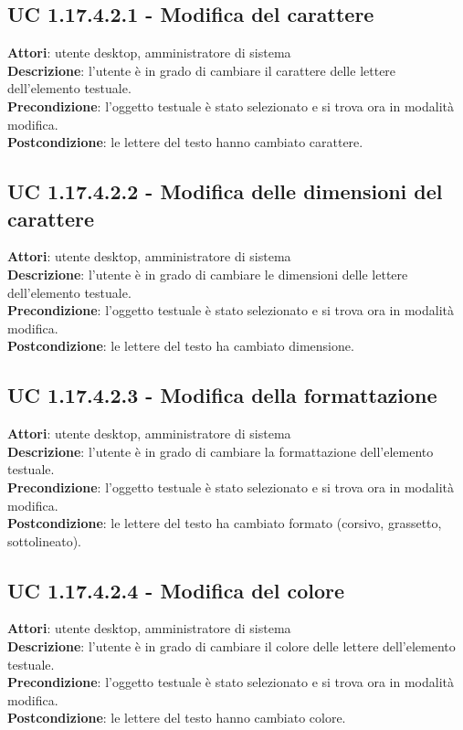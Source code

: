 \subsection{UC 1.17.4.2.1 - Modifica del carattere}{
	\label{uc1.17.4.2.1}
	\textbf{Attori}: utente desktop, amministratore di sistema \\
	\textbf{Descrizione}: l'utente è in grado di cambiare il carattere delle lettere dell’elemento testuale. \\
	\textbf{Precondizione}: l'oggetto testuale è stato selezionato e si trova ora in modalità modifica.\\
	\textbf{Postcondizione}: le lettere del testo hanno cambiato carattere.	\\
	}
\subsection{UC 1.17.4.2.2 - Modifica delle dimensioni del carattere}{
	\label{uc1.17.4.2.2}
	\textbf{Attori}: utente desktop, amministratore di sistema \\
	\textbf{Descrizione}: l'utente è in grado di cambiare le dimensioni delle lettere dell’elemento testuale. \\
	\textbf{Precondizione}: l'oggetto testuale è stato selezionato e si trova ora in modalità modifica.\\
	\textbf{Postcondizione}: le lettere del testo ha cambiato dimensione.	\\
	}
\subsection{UC 1.17.4.2.3 - Modifica della formattazione}{
	\label{uc1.17.4.2.3}
	\textbf{Attori}: utente desktop, amministratore di sistema \\
	\textbf{Descrizione}: l'utente è in grado di cambiare la formattazione dell’elemento testuale. \\
	\textbf{Precondizione}: l'oggetto testuale è stato selezionato e si trova ora in modalità modifica.\\
	\textbf{Postcondizione}: le lettere del testo ha cambiato formato (corsivo, grassetto, sottolineato).	\\
	}
\subsection{UC 1.17.4.2.4 - Modifica del colore}{
	\label{uc1.17.4.2.4}
	\textbf{Attori}: utente desktop, amministratore di sistema \\
	\textbf{Descrizione}: l'utente è in grado di cambiare il colore delle lettere dell’elemento testuale. \\
	\textbf{Precondizione}: l'oggetto testuale è stato selezionato e si trova ora in modalità modifica.\\
	\textbf{Postcondizione}: le lettere del testo hanno cambiato colore.	\\
	}
